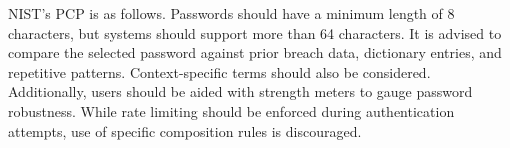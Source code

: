 NIST's \cite{Grassi_Garcia_Fenton_2020} PCP is as follows. Passwords should have a minimum length of 8 characters, but systems should support more than 64 characters. It is advised to compare the selected password against prior breach data, dictionary entries, and repetitive patterns. Context-specific terms should also be considered. Additionally, users should be aided with strength meters to gauge password robustness. While rate limiting should be enforced during authentication attempts, use of specific composition rules is discouraged.
% 
% 


% 
% 
% 

